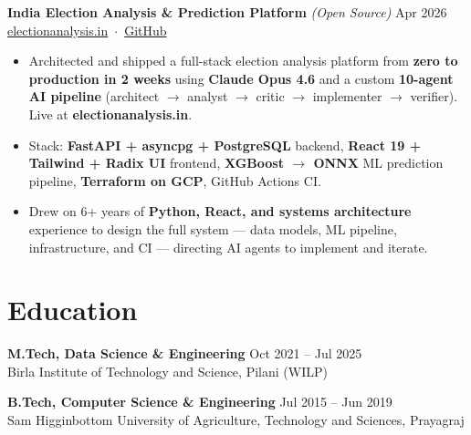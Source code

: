 \documentclass[a4paper,11pt]{article}
\begin{document}
\noindent\textbf{India Election Analysis \& Prediction Platform} \textit{(Open Source)} \hfill Apr 2026 \\
{\color{muted} \href{https://electionanalysis.in}{electionanalysis.in} \,$\cdot$\, \href{https://github.com/CalebJebadurai/elec}{GitHub}}
\begin{itemize}
  \item Architected and shipped a full-stack election analysis platform from \textbf{zero to production in 2 weeks} using \textbf{Claude Opus 4.6} and a custom \textbf{10-agent AI pipeline} (architect $\to$ analyst $\to$ critic $\to$ implementer $\to$ verifier). Live at \textbf{electionanalysis.in}.
  \item Stack: \textbf{FastAPI + asyncpg + PostgreSQL} backend, \textbf{React 19 + Tailwind + Radix UI} frontend, \textbf{XGBoost $\to$ ONNX} ML prediction pipeline, \textbf{Terraform on GCP}, GitHub Actions CI.
  \item Drew on 6+ years of \textbf{Python, React, and systems architecture} experience to design the full system --- data models, ML pipeline, infrastructure, and CI --- directing AI agents to implement and iterate.
\end{itemize}

\section{Education}

\noindent\textbf{M.Tech, Data Science \& Engineering} \hfill Oct 2021 -- Jul 2025 \\
{\color{muted} Birla Institute of Technology and Science, Pilani (WILP)}

\medskip

\noindent\textbf{B.Tech, Computer Science \& Engineering} \hfill Jul 2015 -- Jun 2019 \\
{\color{muted} Sam Higginbottom University of Agriculture, Technology and Sciences, Prayagraj}
\end{document}
